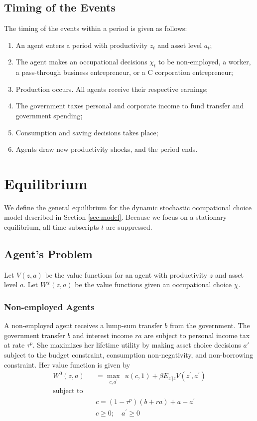 \documentclass[12pt]{article}
\begin{document}
\subsection{Timing of the Events}
The timing of the events within a period is given as follows:

\begin{enumerate}
\item An agent enters a period with productivity $z_t$ and asset level $a_t$;
\item The agent makes an occupational decisions $\chi_t$ to be non-employed, a worker, a pass-through business entrepreneur, or a C corporation entrepreneur;
\item Production occurs. All agents receive their respective earnings; 
\item The government taxes personal and corporate income to fund transfer and government spending;
\item Consumption and saving decisions takes place; 
\item Agents draw new productivity shocks, and the period ends. 
\end{enumerate}
\section{Equilibrium}

We define the general equilibrium for the dynamic stochastic occupational choice model described in Section \ref{sec:model}. Because we focus on a stationary equilibrium, all time subscripts $t$ are suppressed.

\subsection{Agent's Problem}

Let $V(z,a)$ be the value functions for an agent with productivity $z$ and asset level $a$. Let $W^\chi(z,a)$ be the value functions given an occupational choice $\chi$. 

\subsubsection{Non-employed Agents}
A non-employed agent receives a lump-sum transfer $b$ from the government. The government transfer $b$ and interest income $ra$ are subject to personal income tax at rate $\tau^p$. She maximizes her lifetime utility by making asset choice decisions $a'$ subject to the budget constraint, consumption non-negativity, and non-borrowing constraint. Her value function is given by
\begin{eqnarray}
W^0(z,a)&&=\max_{ c,a^{\prime} }\ \  u(c,1)+\beta E_{z^{\prime}|z}
V(z^{\prime},a^{\prime})  \label{eqn:W0}\\
\text{subject to}&&\nonumber\\
&& c = (1-\tau^p)(b+ra)+a-a^{\prime} \nonumber\\
&& c \geq 0;\quad a^{\prime}\geq 0\nonumber
\end{eqnarray}
\end{document}
